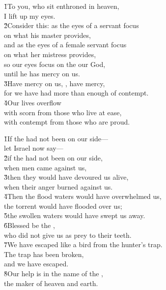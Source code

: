 \begin{poetry}
\poeml \v{1}To you, who sit enthroned in heaven, \\
\poemll    I lift up my eyes. \\
\poeml \v{2}Consider this: as the eyes of a servant focus \\
\poemll    on what his master provides, \\
\poeml and as the eyes of a female servant focus \\
\poemll    on what her mistress provides, \\
\poeml so our eyes focus on the  our God, \\
\poemll    until he has mercy on us. \\
\poeml \v{3}Have mercy on us, , have mercy, \\
\poemll    for we have had more than enough of contempt. \\
\poeml \v{4}Our lives overflow \\
\poemll    with scorn from those who live at ease, \\
\poemlll       with contempt from those who are proud.
\end{poetry}

\begin{poetry}
\poeml \v{1}If the  had not been on our side--- \\
\poemll    let Israel now say--- \\
\poeml \v{2}if the  had not been on our side, \\
\poemll    when men came against us, \\
\poeml \v{3}then they would have devoured us alive, \\
\poemll    when their anger burned against us. \\
\poeml \v{4}Then the flood waters would have overwhelmed us, \\
\poemll    the torrent would have flooded over us; \\
\poeml \v{5}the swollen waters would have swept us away. \\
\poeml \v{6}Blessed be the , \\
\poemll    who did not give us as prey to their teeth. \\
\poeml \v{7}We have escaped like a bird from the hunter's trap. \\
\poemll    The trap has been broken, \\
\poemlll       and we have escaped. \\
\poeml \v{8}Our help is in the name of the , \\
\poemll    the maker of heaven and earth.
\end{poetry}


